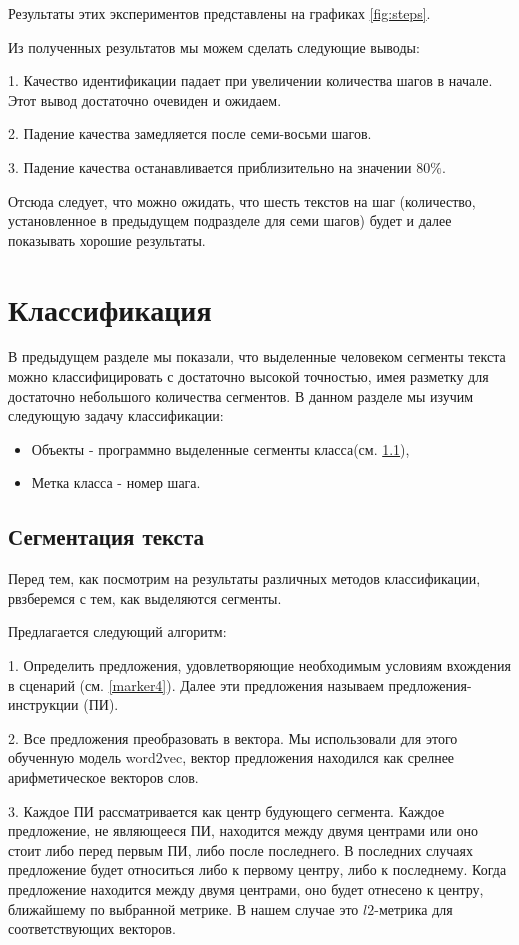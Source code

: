 \documentclass[12pt]{article}
\begin{document}
Результаты этих экспериментов представлены на графиках \ref{fig:steps}.

Из полученных результатов мы можем сделать следующие выводы:

1. Качество идентификации падает при увеличении количества шагов в начале. Этот вывод достаточно очевиден и ожидаем.

2. Падение качества замедляется после семи-восьми шагов.

3. Падение качества останавливается приблизительно на значении 80$\%$.

Отсюда следует, что можно ожидать, что шесть текстов на шаг (количество, установленное в предыдущем подразделе для семи шагов) будет и далее показывать хорошие результаты.

\section{Классификация}

В предыдущем разделе мы показали, что выделенные человеком сегменты текста можно классифицировать с достаточно высокой точностью, имея разметку для достаточно небольшого количества сегментов. В данном разделе мы изучим следующую задачу классификации:
\begin{itemize}
	\item Объекты - программно выделенные сегменты класса(см. \ref{segmentation}),
	\item Метка класса - номер шага.
\end{itemize}

\subsection{Сегментация текста}
\label{segmentation}
Перед тем, как посмотрим на результаты различных методов классификации, рвзберемся с тем, как выделяются сегменты.

Предлагается следующий алгоритм:


	1. Определить предложения, удовлетворяющие необходимым условиям вхождения в сценарий (см. \ref{marker4}). Далее эти предложения называем предложения-инструкции (ПИ). 

	2. Все предложения преобразовать в вектора. Мы использовали для этого обученную модель word2vec, вектор предложения находился как срелнее арифметическое векторов слов.

	3. Каждое ПИ рассматривается как центр будующего сегмента. Каждое предложение, не являющееся ПИ, находится между двумя центрами или оно стоит либо перед первым ПИ, либо после последнего. В последних случаях предложение будет относиться либо к первому центру, либо к последнему. Когда предложение находится между двумя центрами, оно будет отнесено к центру, ближайшему по выбранной метрике. В нашем случае это $l2$-метрика для соответствующих векторов.
	
\end{document}

